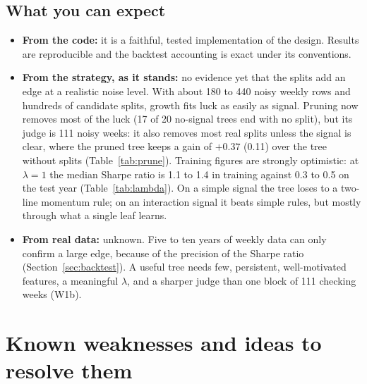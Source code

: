\documentclass[11pt,a4paper]{article}
\newcommand{\1}{\mathbf{1}}
\begin{document}
\subsection{What you can expect}
\begin{itemize}
\item \textbf{From the code:} it is a faithful, tested implementation of the design. Results are reproducible and the backtest accounting is exact under its conventions.
\item \textbf{From the strategy, as it stands:} no evidence yet that the splits add an edge at a realistic noise level. With about 180 to 440 noisy weekly rows and hundreds of candidate splits, growth fits luck as easily as signal. Pruning now removes most of the luck (17 of 20 no-signal trees end with no split), but its judge is 111 noisy weeks: it also removes most real splits unless the signal is clear, where the pruned tree keeps a gain of $+0.37$ (0.11) over the tree without splits (Table~\ref{tab:prune}). Training figures are strongly optimistic: at $\lambda=1$ the median Sharpe ratio is 1.1 to 1.4 in training against 0.3 to 0.5 on the test year (Table~\ref{tab:lambda}). On a simple signal the tree loses to a two-line momentum rule; on an interaction signal it beats simple rules, but mostly through what a single leaf learns.
\item \textbf{From real data:} unknown. Five to ten years of weekly data can only confirm a large edge, because of the precision of the Sharpe ratio (Section~\ref{sec:backtest}). A useful tree needs few, persistent, well-motivated features, a meaningful $\lambda$, and a sharper judge than one block of 111 checking weeks (W1b).
\end{itemize}

\section{Known weaknesses and ideas to resolve them}\label{sec:weak}
\end{document}
